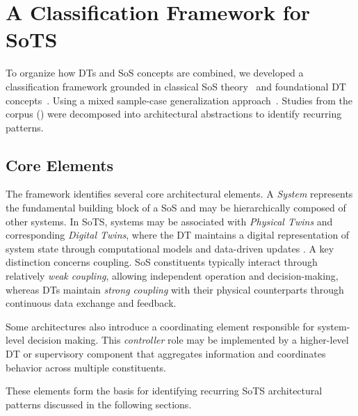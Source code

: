\section{A Classification Framework for SoTS}\label{sec:literature-review-classification}
To organize how DTs and SoS concepts are combined, we developed a classification framework grounded in classical SoS theory~\cite{maier1998architecting, maier2014role} and foundational DT concepts~\cite{kritzinger2018digital}. Using a mixed sample-case generalization approach~\cite{wieringa2015six}. Studies from the corpus () were decomposed into architectural abstractions to identify recurring patterns.

\subsection{Core Elements}
The framework identifies several core architectural elements. A \textit{System} represents the fundamental building block of a SoS and may be hierarchically composed of other systems. In SoTS, systems may be associated with \textit{Physical Twins} and corresponding \textit{Digital Twins}, where the DT maintains a digital representation of system state through computational models and data-driven updates \cite{kritzinger2018digital}. A key distinction concerns coupling. SoS constituents typically interact through relatively \textit{weak coupling}, allowing independent operation and decision-making, whereas DTs maintain \textit{strong coupling} with their physical counterparts through continuous data exchange and feedback.

Some architectures also introduce a coordinating element responsible for system-level decision making. This \textit{controller} role may be implemented by a higher-level DT or supervisory component that aggregates information and coordinates behavior across multiple constituents.

These elements form the basis for identifying recurring SoTS architectural patterns discussed in the following sections.

